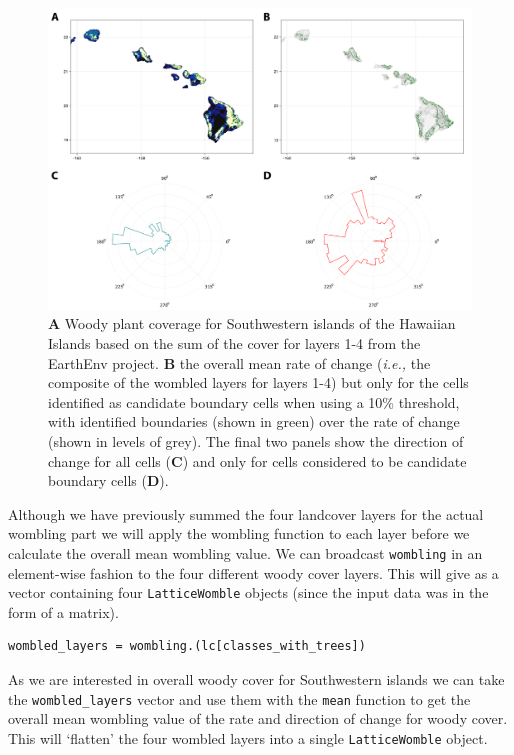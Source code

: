 \begin{figure}[h]
    \centering
    \includegraphics[width=\textwidth]{figures/fig_eg.png}
    \caption{\textbf{A} Woody plant coverage for Southwestern islands of the
Hawaiian Islands based on the sum of the cover for layers 1-4 from the
EarthEnv project. \textbf{B} the overall mean rate of change
(\emph{i.e.,} the composite of the wombled layers for layers 1-4) but
only for the cells identified as candidate boundary cells when using a
10\% threshold, with identified boundaries (shown in green) over the
rate of change (shown in levels of grey). The final two panels show the
direction of change for all cells (\textbf{C}) and only for cells
considered to be candidate boundary cells
(\textbf{D}).}
    \label{fig:example}
\end{figure}

Although we have previously summed the four landcover layers for the
actual wombling part we will apply the wombling function to each layer
before we calculate the overall mean wombling value. We can broadcast
\texttt{wombling} in an element-wise fashion to the four different woody
cover layers. This will give as a vector containing four
\texttt{LatticeWomble} objects (since the input data was in the form of
a matrix).

\begin{verbatim}
wombled_layers = wombling.(lc[classes_with_trees])
\end{verbatim}

As we are interested in overall woody cover for Southwestern islands we
can take the \texttt{wombled\_layers} vector and use them with the
\texttt{mean} function to get the overall mean wombling value of the
rate and direction of change for woody cover. This will `flatten' the
four wombled layers into a single \texttt{LatticeWomble} object.

